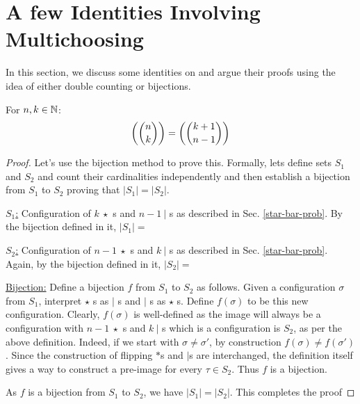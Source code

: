 \section{A few Identities Involving Multichoosing}
In this section, we discuss some identities on  and argue their proofs using the idea of either double counting or bijections.
\begin{proposition}[{\bf Identity 1}] For $n,k \in \mathbb{N}$:
$$\textrm{$\left(\binom{n}{k}\right)$}=\textrm{$\left(\binom{k+1}{n-1}\right)$}$$
\end{proposition}
\begin{proof}
Let's use the bijection method to prove this. Formally, lets define sets $S_1$ and $S_2$ and count their cardinalities independently and then establish a bijection from $S_1$ to $S_2$ proving that $|S_1|=|S_2|$.
\begin{description}
\item \underline{$S_1$:} Configuration of $k~\star$ s and $n-1~|$ s as described in Sec. \ref{star-bar-prob}. By the bijection defined in it, $|S_1|=$ 
\item \underline{$S_2$:} Configuration of $n-1~\star$ s and $k~|$ s as described in Sec. \ref{star-bar-prob}. Again, by the bijection defined in it, $|S_2|=$
\item \underline{Bijection:} Define a bijection $f$ from $S_1$ to $S_2$ as follows. Given a configuration $\sigma$ from $S_1$, interpret $\star$ s as $|$ s and $|$ s as $\star$ s. Define $f(\sigma)$ to be this new configuration. Clearly, $f(\sigma)$ is well-defined as the image will always be a configuration with $n-1~\star$ s and $k~|$ s which is a configuration is $S_2$, as per the above definition. Indeed, if we start with $\sigma \ne \sigma'$, by construction $f(\sigma) \ne f(\sigma')$. Since the construction of flipping $*$s and $|$s are interchanged, the definition itself gives a way to construct a pre-image for every $\tau \in S_2$. Thus $f$ is a bijection.
\end{description}
As $f$ is a bijection from $S_1$ to $S_2$, we have $|S_1|=|S_2|$. This completes the proof 
\end{proof}

